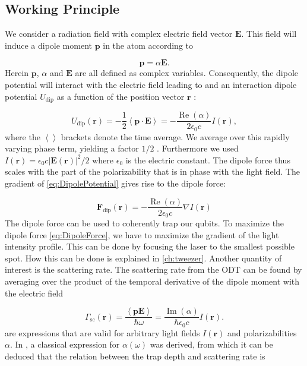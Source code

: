 \subsection{Working Principle}

We consider a radiation field with complex electric field vector $\mathbf{E}$. 
This field will induce a dipole moment $\mathbf{p}$ in the atom according to 
	
\begin{equation}\label{eq:DipoleMoment}
	\mathbf{p} = \alpha \mathbf{E}.
\end{equation}
Herein $\mathbf{p}$, $\alpha$ and $\mathbf{E}$ are all defined as complex variables. Consequently, the dipole potential will interact with the electric field leading to and an interaction dipole potential $U_{\text{dip}}$ as a function of the position vector $\mathbf{r}$ \cite{Grimm2000}:

\begin{equation}\label{eq:DipolePotential}
	U_{\text{dip}}(\mathbf{r}) = 
	-\frac{1}{2} \left\langle \mathbf{p}\cdot\mathbf{E} \right\rangle=
	- \frac{\operatorname{Re}(\alpha)}{2\epsilon_0 c} I(\mathbf{r}),
\end{equation}
where the $\left\langle\right\rangle$ brackets denote the time average.
We average over this rapidly varying phase term, yielding a factor $1/2$ \cite{Grimm2000}.
Furthermore we used $I(\mathbf{r}) = \epsilon_0 c |\mathbf{E}(\mathbf{r})|^2/2$ where $\epsilon_0$ is the electric constant. 
The dipole force thus scales with the part of the polarizability that is in phase with the light field.
The gradient of \cref{eq:DipolePotential} gives rise to the dipole force:

\begin{equation}\label{eq:DipoleForce}
	\mathbf{F}_{\text{dip}}(\mathbf{r}) = - \frac{\operatorname{Re}(\alpha)}{2\epsilon_0c}\nabla I(\mathbf{r})
\end{equation}
The dipole force can be used to coherently trap our qubits. 
To maximize the dipole force \cref{eq:DipoleForce}, 
we have to maximize the gradient of the light intensity profile.
This can be done by focusing the laser to the smallest possible spot.
How this can be done is explained in \cref{ch:tweezer}. 
Another quantity of interest is the scattering rate.
The scattering rate from the ODT can be found by averaging over the product of the temporal derivative of the dipole moment with the electric field \cite{Grimm2000}

\begin{equation}\label{eq:ScatteringRate}
	\Gamma_{\text{sc}}(\mathbf{r}) = \frac{\left\langle \mathbf{p} \mathbf{E} \right\rangle}{\hbar \omega}
	 = \frac{\operatorname{Im}(\alpha)}{\hbar \epsilon_0 c} I(\mathbf{r}).
\end{equation}
 are expressions that are valid for arbitrary light fields $I(\mathbf{r})$ and polarizabilities $\alpha$.
In \cite{Grimm2000}, a classical expression for $\alpha(\omega)$ was derived, from which it can be deduced that the relation between the trap depth and scattering rate is

